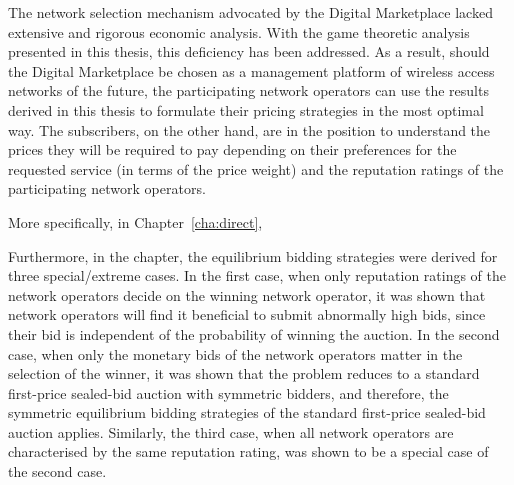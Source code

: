 The network selection mechanism advocated by the Digital Marketplace lacked extensive and rigorous economic analysis. With the game theoretic analysis presented in this thesis, this deficiency has been addressed. As a result, should the Digital Marketplace be chosen as a management platform of wireless access networks of the future, the participating network operators can use the results derived in this thesis to formulate their pricing strategies in the most optimal way. The subscribers, on the other hand, are in the position to understand the prices they will be required to pay depending on their preferences for the requested service (in terms of the price weight) and the reputation ratings of the participating network operators.

More specifically, in Chapter~\ref{cha:direct}, 

Furthermore, in the chapter, the equilibrium bidding strategies were derived for three special/extreme cases. In the first case, when only reputation ratings of the network operators decide on the winning network operator, it was shown that network operators will find it beneficial to submit abnormally high bids, since their bid is independent of the probability of winning the auction.  In the second case, when only the monetary bids of the network operators matter in the selection of the winner, it was shown that the problem reduces to a standard first-price sealed-bid auction with symmetric bidders, and therefore, the symmetric equilibrium bidding strategies of the standard first-price sealed-bid auction applies. Similarly, the third case, when all network operators are characterised by the same reputation rating, was shown to be a special case of the second case. 

